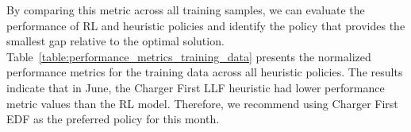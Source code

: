 By comparing this metric across all training samples, we can evaluate the performance of RL and heuristic policies and identify the policy that provides the smallest gap relative to the optimal solution.  
Table~\ref{table:performance_metrics_training_data} presents the normalized performance metrics for the training data across all heuristic policies. 
The results indicate that in June, the Charger First LLF heuristic had lower performance metric values than the RL model. Therefore, we recommend using Charger First EDF as the preferred policy for this month.

\fi

